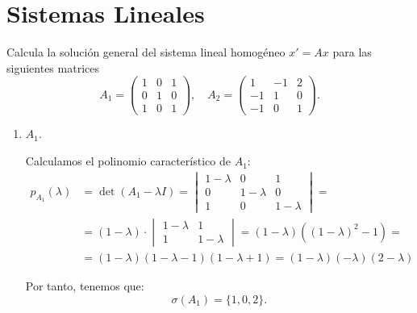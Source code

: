\section{Sistemas Lineales}

\begin{ejercicio}\label{ej:5.1}
    Calcula la solución general del sistema lineal homogéneo $x' = Ax$ para las siguientes matrices
    \[
        A_1 =
        \begin{pmatrix}
            1 & 0 & 1 \\
            0 & 1 & 0 \\
            1 & 0 & 1
        \end{pmatrix},
        \quad
        A_2 =
        \begin{pmatrix}
            1 & -1 & 2 \\
            -1 & 1 & 0 \\
            -1 & 0 & 1
        \end{pmatrix}.
    \]

    \begin{enumerate}
        \item $A_1$.
        
        Calculamos el polinomio característico de $A_1$:
        \begin{align*}
            p_{A_1}(\lambda) &= \det(A_1 - \lambda I)
            = \begin{vmatrix}
                1 - \lambda & 0 & 1\\
                0 & 1 - \lambda & 0\\
                1 & 0 & 1 - \lambda
            \end{vmatrix}
            =\\&= (1 - \lambda)\cdot \begin{vmatrix}
                1 - \lambda & 1\\
                1 & 1 - \lambda
            \end{vmatrix}
            = (1 - \lambda)\left((1 - \lambda)^2 - 1\right)
            =\\&= (1 - \lambda)(1-\lambda - 1)(1 - \lambda + 1)
            = (1 - \lambda)(-\lambda)(2 - \lambda)
        \end{align*}

        Por tanto, tenemos que:
        \begin{equation*}
            \sigma(A_1) = \{1, 0, 2\}.
        \end{equation*}


\end{enumerate}
\end{ejercicio}
